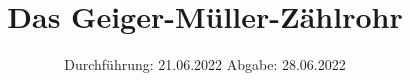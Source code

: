 

\subject{V703}
\title{Das Geiger-Müller-Zählrohr}
\date{%
  Durchführung: 21.06.2022
  \hspace{3em}
  Abgabe: 28.06.2022
}



\maketitle
\thispagestyle{empty}
\tableofcontents
\newpage






\printbibliography{}

\appendix
\newpage



